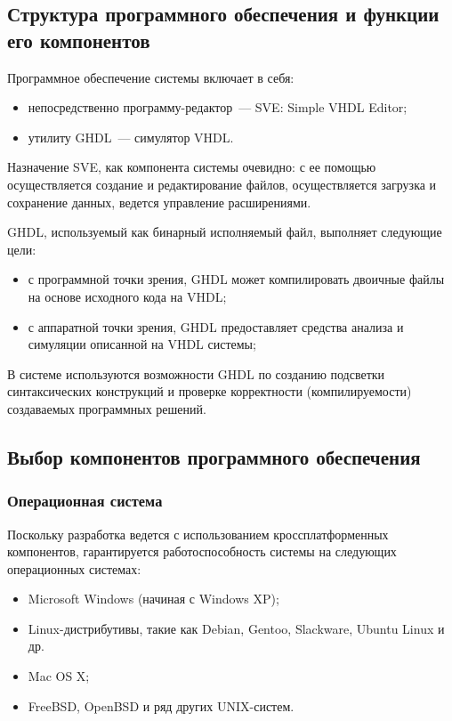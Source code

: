 \subsection{Структура программного обеспечения и функции его компонентов}\label{sec:software-structure-components}
Программное обеспечение системы включает в себя:
\begin{itemize}
  \item непосредственно программу-редактор~--- SVE: Simple VHDL Editor;
  \item утилиту GHDL~--- симулятор VHDL.
\end{itemize}

Назначение SVE, как компонента системы очевидно: с ее помощью осуществляется создание и редактирование файлов, осуществляется загрузка и сохранение данных, ведется управление расширениями.

GHDL, используемый как бинарный исполняемый файл, выполняет следующие цели:
\begin{itemize}
  \item с программной точки зрения, GHDL может компилировать двоичные файлы на основе исходного кода на VHDL;
  \item с аппаратной точки зрения, GHDL предоставляет средства анализа и симуляции описанной на VHDL системы;
\end{itemize}

В системе используются возможности GHDL по созданию подсветки синтаксических конструкций и проверке корректности (компилируемости) создаваемых программных решений.


\subsection{Выбор компонентов программного обеспечения}

\subsubsection{Операционная система}
Поскольку разработка ведется с использованием кроссплатформенных компонентов, гарантируется работоспособность системы на следующих операционных системах:
\begin{itemize}
  \item Microsoft Windows (начиная с Windows XP);
  \item Linux-дистрибутивы, такие как Debian, Gentoo, Slackware, Ubuntu Linux и др.
  \item Mac OS X;
  \item FreeBSD, OpenBSD и ряд других UNIX-систем.
\end{itemize}

